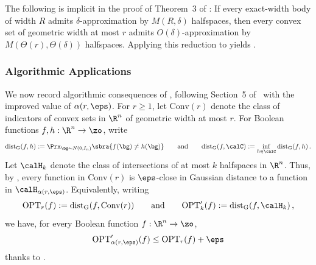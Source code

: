 \documentclass[11pt]{article}
\newcommand{\dG}{\mathrm{dist}_{\mathrm{G}}}
\newcommand{\Conv}{\mathrm{Conv}}
\newcommand{\newalpha}{\alpha(r,\eps)}
\newcommand{\OPT}{\mathrm{OPT}}
\begin{document}
The following is implicit in the proof of Theorem~3 of \cite{de2026sparsifying}: If every exact-width body of width $R$ admits $\delta$-approximation by $M(R,\delta)$ halfspaces, then every convex set of geometric width at most $r$ admits $O(\delta)$-approximation by $M(\Theta(r),\Theta(\delta))$ halfspaces. 
Applying this reduction to  yields . 

\polytopeapproxthm*


\subsubsection{Algorithmic Applications}

We now record algorithmic consequences of , following
Section~5 of~\cite{de2026sparsifying} with the improved value of $\newalpha$. 
For $r\geq 1$, let $\Conv(r)$ denote the class of indicators of convex sets in $\R^n$ of geometric width at most $r$.
For Boolean functions $f,h:\R^n\to\zo$, write
\[
	\dG(f,h)
	:=
	\Prx_{\bg\sim N(0,I_n)}
	\sbra{
		f(\bg)\neq h(\bg)
	}
	\qquad\text{and}\qquad
	\dG(f,\calC)
	:=
	\inf_{h\in\calC}\dG(f,h)\,.
\]
Let $\calH_k$ denote the class of intersections of at most $k$ halfspaces in $\R^n$. 
Thus, by , every function in $\Conv(r)$ is $\eps$-close in Gaussian distance to a function in $\calH_{\newalpha}$.
Equivalently, writing 
\[
	\OPT_r(f)
	:=
	\dG(f,\Conv(r))
	\qquad\text{and}\qquad 
	\OPT'_k(f) 
	:= 
	\dG(f, \calH_k)\,,
\]
we have, for every Boolean function $f:\R^n\to\zo$, 
\begin{equation} \label{eq:stitch}
	\OPT'_{\newalpha}(f)
	\leq
	\OPT_r(f)+\eps
\end{equation}
thanks to . 
\end{document}
